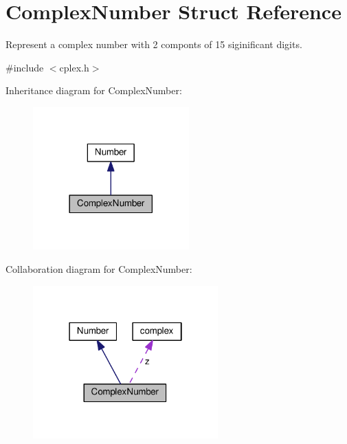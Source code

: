 \hypertarget{structComplexNumber}{}\section{Complex\+Number Struct Reference}
\label{structComplexNumber}


Represent a complex number with 2 componts of 15 siginificant digits.  




{\ttfamily \#include $<$cplex.\+h$>$}



Inheritance diagram for Complex\+Number\+:\nopagebreak
\begin{figure}[H]
\begin{center}
\leavevmode
\includegraphics[width=170pt]{structComplexNumber__inherit__graph}
\end{center}
\end{figure}


Collaboration diagram for Complex\+Number\+:\nopagebreak
\begin{figure}[H]
\begin{center}
\leavevmode
\includegraphics[width=202pt]{structComplexNumber__coll__graph}
\end{center}
\end{figure}
